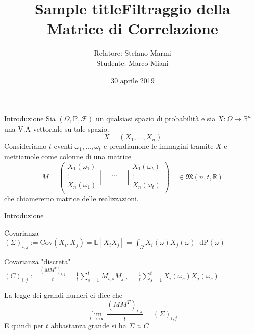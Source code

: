 \documentclass{beamer}
\title{Sample title}
\author[Marco Miani]{Relatore: Stefano Marmi\\
\vspace{5pt}
Studente: Marco Miani
\vspace{10pt}}
\institute{Scuola Normale Superiore}
\date{30 aprile 2019}
\title[Filtraggio della Matrice di Correlazione] %
{Filtraggio della Matrice di Correlazione}
\newcommand{\bbR}{\mathbb{R}}
\newcommand*\diff{\mathop{}\!\mathrm{d}}
\newcommand{\1}{\mathbbm{1}}
\begin{document}
 
\begin{frame}[plain]
	\maketitle
\end{frame}


\begin{frame}{Introduzione}
Sia $(\Omega,\mathrm{P},\mathcal{F})$ un qualsiasi spazio di probabilità e sia $X:\Omega\mapsto\bbR^n$ una V.A vettoriale su tale spazio.
\[
X=(X_1,\dots,X_n)
\]
\pause
Consideriamo $t$ eventi $\omega_1,\dots,\omega_t$ e prendiamone le immagini tramite $X$ e mettiamole come colonne di una matrice
\[
M = 
\left(
\begin{array}{c}
X_1(\omega_1) \\
\vdots \\
X_n(\omega_1) \\
\end{array}
\left|
\begin{array}{c}
\\
\quad \dots \quad \\
\\
\end{array}
\right|
\begin{array}{c}
X_1(\omega_t) \\
\vdots \\
X_n(\omega_t) \\
\end{array}
\right)
\quad \in \mathfrak{M}(n,t,\mathbb{R})
\]
che chiameremo matrice delle realizzazioni.
\end{frame}

\begin{frame}{Introduzione}
\begin{block}{Covarianza}
$(\Sigma)_{i,j} := \mathrm{Cov}(X_i,X_j) = \mathbb{E}[X_iX_j] = \displaystyle\int_\Omega X_i(\omega)X_j(\omega) \diff \mathrm{P}(\omega)$
\end{block}
\pause
\begin{block}{Covarianza "discreta"}
$\displaystyle (C)_{i,j} := \frac{(MM^T)_{i,j}}{t} = \frac{1}{t}\sum_{s=1}^t M_{i,s}M_{j,s} = \frac{1}{t}\sum_{s=1}^t X_i(\omega_s) X_j(\omega_s)$
\end{block}
\pause
La legge dei grandi numeri ci dice che
\[
\lim_{t \to \infty} \frac{(MM^T)_{i,j}}{t} = (\Sigma)_{i,j}
\]
E quindi per $t$ abbastanza grande si ha $\Sigma \approx C$

\end{frame}
\end{document}
